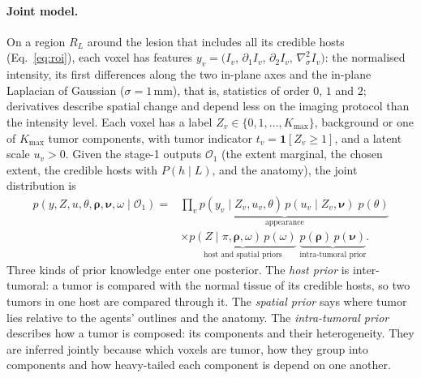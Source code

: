 \documentclass[fleqn,10pt]{olplainarticle}
\begin{document}
\paragraph{Joint model.} On a region $R_L$ around the lesion that includes all its credible hosts (Eq.~\eqref{eq:roi}),
each voxel has features $y_v=\bigl(I_v,\,\partial_1 I_v,\,\partial_2 I_v,\,\nabla^2_{\sigma}I_v\bigr)$: the normalised intensity,
its first differences along the two in-plane axes and the in-plane Laplacian of Gaussian ($\sigma=1$\,mm), that is,
statistics of order $0$, $1$ and $2$; derivatives describe spatial change and depend less on the imaging protocol than the
intensity level. Each voxel has a label $Z_v\in\{0,1,\dots,K_{\max}\}$, background or one of $K_{\max}$ tumor components, with
tumor indicator $t_v=\mathbf{1}[Z_v\ge1]$, and a latent scale $u_v>0$. Given the stage-1 outputs $\mathcal{O}_1$ (the extent
marginal, the chosen extent, the credible hosts with $P(h\mid L)$, and the anatomy), the joint distribution is
\begin{equation}
\label{eq:joint}
\begin{aligned}
p(y,Z,u,\theta,\boldsymbol\rho,\boldsymbol\nu,\omega\mid\mathcal{O}_1)={}&
\underbrace{\textstyle\prod_{v}p(y_v\mid Z_v,u_v,\theta)\,p(u_v\mid Z_v,\boldsymbol\nu)\;p(\theta)}_{\text{appearance}}\\
&\times\underbrace{p(Z\mid\pi,\boldsymbol\rho,\omega)\,p(\omega)}_{\text{host and spatial priors}}\;
\underbrace{p(\boldsymbol\rho)\,p(\boldsymbol\nu)}_{\text{intra-tumoral prior}}.
\end{aligned}
\end{equation}
Three kinds of prior knowledge enter one posterior. The \emph{host prior} is inter-tumoral: a tumor is compared with the normal
tissue of its credible hosts, so two tumors in one host are compared through it. The \emph{spatial prior} says where tumor
lies relative to the agents' outlines and the anatomy. The \emph{intra-tumoral prior} describes how a tumor is composed: its
components and their heterogeneity. They are inferred jointly because which voxels are tumor, how they group into components
and how heavy-tailed each component is depend on one another.
\end{document}
